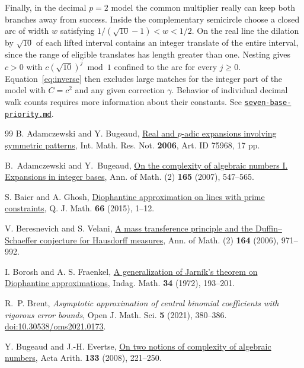 \documentclass[11pt,reqno,a4paper]{amsart}
\theoremstyle{remark}
\newcommand{\companion}[1]{\href{../#1.md}{\nolinkurl{#1.md}}}
\begin{document}
Finally, in the decimal \(p=2\) model the common multiplier really
can keep both branches away from success. Inside the complementary
semicircle choose a closed arc of width \(w\) satisfying
\(1/(\sqrt{10}-1)<w<1/2\). On the real line the dilation by \(\sqrt{10}\)
of each lifted interval contains an integer translate of the entire
interval, since the range of eligible translates has length greater
than one. Nesting gives \(c>0\) with \(c(\sqrt{10})^j\bmod1\) confined
to the arc for every \(j\ge0\). Equation~\eqref{eq:inverse} then
excludes large matches for the integer part of the model with \(C=c^2\)
and any given correction \(\gamma\). Behavior of individual decimal
walk counts requires more information about their constants.
See \companion{seven-base-priority}.

\begin{thebibliography}{99}
B. Adamczewski and Y. Bugeaud,
\href{https://doi.org/10.1155/IMRN/2006/75968}{Real and \(p\)-adic expansions involving symmetric patterns},
Int. Math. Res. Not. \textbf{2006}, Art. ID 75968, 17 pp.

B.~Adamczewski and Y.~Bugeaud,
\href{https://doi.org/10.4007/annals.2007.165.547}{On the complexity of algebraic numbers I. Expansions in integer bases},
Ann. of Math. (2) \textbf{165} (2007), 547--565.

S. Baier and A. Ghosh,
\href{https://doi.org/10.1093/qmath/hau016}{Diophantine approximation on lines with prime constraints},
Q. J. Math. \textbf{66} (2015), 1--12.

V. Beresnevich and S. Velani,
\href{https://doi.org/10.4007/annals.2006.164.971}{A mass transference principle and the Duffin--Schaeffer conjecture for Hausdorff measures},
Ann. of Math. (2) \textbf{164} (2006), 971--992.

I. Borosh and A. S. Fraenkel,
\href{https://doi.org/10.1016/1385-7258(72)90055-8}{A generalization of Jarn\'ik's theorem on Diophantine approximations},
Indag. Math. \textbf{34} (1972), 193--201.

R.~P. Brent, \emph{Asymptotic approximation of central binomial
coefficients with rigorous error bounds}, Open J. Math. Sci.
\textbf{5} (2021), 380--386.
\href{https://doi.org/10.30538/oms2021.0173}{doi:10.30538/oms2021.0173}.

Y. Bugeaud and J.-H. Evertse,
\href{https://doi.org/10.4064/aa133-3-3}{On two notions of complexity of algebraic numbers},
Acta Arith. \textbf{133} (2008), 221--250.


\end{thebibliography}
\end{document}
